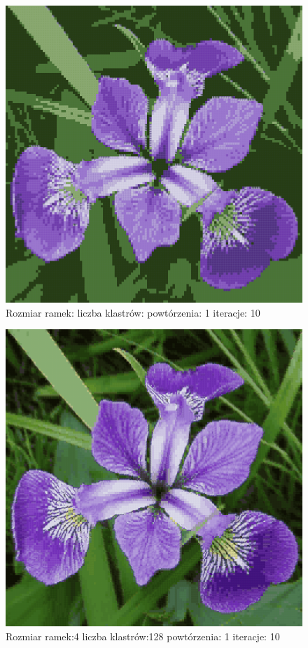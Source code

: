 \documentclass{classrep}
\begin{document}
{{{{\begin{figure}[!htbp]
\centering
\includegraphics[width=\textwidth,width=90mm]{obrazy/iris_R4_K12_P1_It10.png}
\caption{Rozmiar ramek: liczba klastrów: powtórzenia: 1 iteracje: 10 }
\end{figure}

\begin{figure}[!htbp]
\centering
\includegraphics[width=\textwidth,width=90mm]{obrazy/iris_R4_K128_P1_It10.png}
\caption{Rozmiar ramek:4 liczba klastrów:128 powtórzenia: 1 iteracje: 10 }
\end{figure}

}}}}
\end{document}
